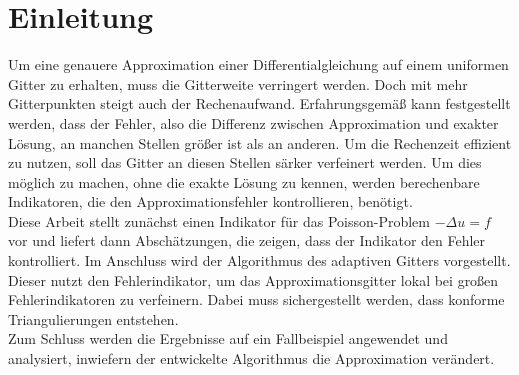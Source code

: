 \chapter{Einleitung}
\renewcommand{\thepage}{\arabic{page}}
\setcounter{page}{1}
Um eine genauere Approximation einer Differentialgleichung auf einem uniformen Gitter zu erhalten, muss die Gitterweite verringert werden. Doch mit mehr Gitterpunkten steigt auch der Rechenaufwand. Erfahrungsgemäß kann festgestellt werden, dass der Fehler, also die Differenz zwischen Approximation und exakter Lösung, an manchen Stellen größer ist als an anderen. Um die Rechenzeit effizient zu nutzen, soll das Gitter an diesen Stellen särker verfeinert werden. Um dies möglich zu machen, ohne die exakte Lösung zu kennen, werden berechenbare Indikatoren, die den Approximationsfehler kontrollieren, benötigt. \\
Diese Arbeit stellt zunächst einen Indikator für das Poisson-Problem $-\Delta u =f$ vor und liefert dann  Abschätzungen, die zeigen, dass der Indikator den Fehler kontrolliert. Im Anschluss wird der Algorithmus des adaptiven Gitters vorgestellt. Dieser nutzt den Fehlerindikator, um das Approximationsgitter lokal bei großen Fehlerindikatoren zu verfeinern. Dabei muss sichergestellt werden, dass konforme Triangulierungen entstehen. \\
Zum Schluss werden die Ergebnisse auf ein Fallbeispiel angewendet und analysiert, inwiefern der entwickelte Algorithmus die Approximation verändert.